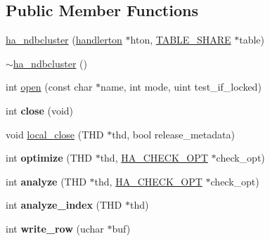 \subsection*{Public Member Functions}
\begin{DoxyCompactItemize}
\item 
\mbox{\hyperlink{classha__ndbcluster_a743f4c09bc748bd6d1fce84520472614}{ha\+\_\+ndbcluster}} (\mbox{\hyperlink{structhandlerton}{handlerton}} $\ast$hton, \mbox{\hyperlink{structTABLE__SHARE}{T\+A\+B\+L\+E\+\_\+\+S\+H\+A\+RE}} $\ast$table)
\item 
\mbox{\hyperlink{classha__ndbcluster_a2a0e969376e3f2d0677cd4094ae04b7e}{$\sim$ha\+\_\+ndbcluster}} ()
\item 
int \mbox{\hyperlink{classha__ndbcluster_a5e1e0e1c8aa3764c955f46b8845b7a1a}{open}} (const char $\ast$name, int mode, uint test\+\_\+if\+\_\+locked)
\item 
\mbox{\label{classha__ndbcluster_ac65e17ed6b647f78ca2a933546a5c353}} 
int {\bfseries close} (void)
\item 
void \mbox{\hyperlink{classha__ndbcluster_ac5921b0992ea58b7698d649fcc7d50c1}{local\+\_\+close}} (T\+HD $\ast$thd, bool release\+\_\+metadata)
\item 
\mbox{\label{classha__ndbcluster_aadffcd5f17a0b869bea7260425573df6}} 
int {\bfseries optimize} (T\+HD $\ast$thd, \mbox{\hyperlink{structst__ha__check__opt}{H\+A\+\_\+\+C\+H\+E\+C\+K\+\_\+\+O\+PT}} $\ast$check\+\_\+opt)
\item 
\mbox{\label{classha__ndbcluster_a1499ebf91623f1a275a7c205cd1fa90f}} 
int {\bfseries analyze} (T\+HD $\ast$thd, \mbox{\hyperlink{structst__ha__check__opt}{H\+A\+\_\+\+C\+H\+E\+C\+K\+\_\+\+O\+PT}} $\ast$check\+\_\+opt)
\item 
\mbox{\label{classha__ndbcluster_a0417e2c67e5734e072ea5f2f015d3dc7}} 
int {\bfseries analyze\+\_\+index} (T\+HD $\ast$thd)
\item 
\mbox{\label{classha__ndbcluster_a5407251181eef104fdf5e2014f040ce2}} 
int {\bfseries write\+\_\+row} (uchar $\ast$buf)
\item 
\mbox{\label{classha__ndbcluster_a7569a9e0da9ec2f5863b15185f401ed0}} 

\end{DoxyCompactItemize}
